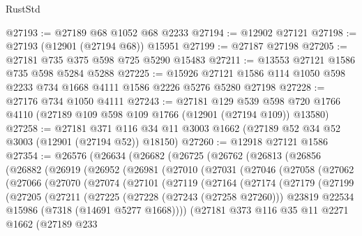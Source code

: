\begin{lexlean}{RustStd}
\begin{coremodule}
@27193 := @27189 @68 @1052 @68 @2233
@27194 := @12902 @27121
@27198 := @27193 (@12901 (@27194 @68)) @15951
@27199 := @27187 @27198
@27205 := @27181 @735 @375 @598 @725 @5290 @15483
@27211 := @13553 @27121 @1586 @735 @598 @5284 @5288
@27225 := @15926 @27121 @1586 @114 @1050 @598 @2233 @734 @1668 @4111 @1586 @2226 @5276 @5280 @27198
@27228 := @27176 @734 @1050 @4111
@27243 := @27181
    @129
    @539
    @598
    @720
    @1766
    @4110
    (@27189 @109 @598 @109 @1766 (@12901 (@27194 @109)) @13580)
@27258 := @27181
    @371
    @116
    @34
    @11
    @3003
    @1662
    (@27189 @52 @34 @52 @3003 (@12901 (@27194 @52)) @18150)
@27260 := @12918 @27121 @1586
@27354 := @26576
    (@26634
      (@26682
        (@26725
          (@26762
            (@26813
              (@26856
                (@26882
                  (@26919
                    (@26952
                      (@26981
                        (@27010
                          (@27031
                            (@27046
                              (@27058
                                (@27062
                                  (@27066
                                    (@27070
                                      (@27074
                                        (@27101
                                          (@27119
                                            (@27164
                                              (@27174
                                                (@27179
                                                  (@27199
                                                    (@27205
                                                      (@27211
                                                        (@27225
                                                          (@27228 (@27243 (@27258 @27260)))
                                                          @23819
                                                          @22534
                                                          @15986
                                                          (@7318 (@14691 @5277 @1668))))
                                                      (@27181
                                                        @373
                                                        @116
                                                        @35
                                                        @11
                                                        @2271
                                                        @1662
                                                        (@27189
                                                          @233

\end{coremodule}
\end{lexlean}
